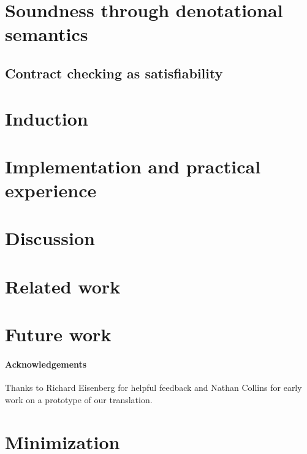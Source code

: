 \documentclass[preprint,nocopyrightspace]{sigplanconf}
\begin{document}
\section{Soundness through denotational semantics}
   \label{sect:contracts}\label{ssect:denot}
  

\subsection{Contract checking as satisfiability}\label{sect:soundness}
  

\section{Induction}\label{sect:induction}
  

\section{Implementation and practical experience}\label{sect:implementation}
  

\section{Discussion}\label{sect:discussion}
  

\section{Related work}\label{sect:related}
  

\section{Future work}\label{sect:future}
  

\paragraph{Acknowledgements}
Thanks to Richard Eisenberg for helpful feedback and Nathan Collins
for early work on a prototype of our translation.




\appendix

\section{Minimization}
   
\end{document}
